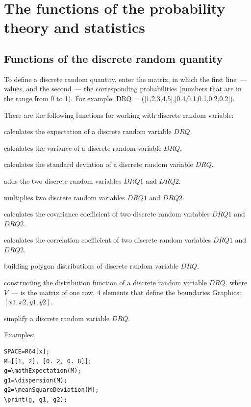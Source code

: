 \chapter{The functions of the probability theory and statistics}

\section{ Functions of the discrete random quantity}
To define a discrete random quantity, 
enter the matrix, in which the first line~--- values, and the second~--- the corresponding probabilities
(numbers that are in the range from 0 to 1). For example: DRQ = ([1,2,3,4,5],[0.4,0.1,0.1,0.2,0.2]).

There are the following functions for working with discrete random variable:

 calculates the expectation of a discrete random variable $DRQ$. 

 calculates the variance of a discrete random variable $DRQ$. 

 calculates the standard deviation of a discrete random variable $DRQ$. 

 adds the two discrete random variables $DRQ1$ and $DRQ2$. 

 multiplies two discrete random variables $DRQ1$ and $DRQ2$. 

 calculates the covariance coefficient of two discrete random variables $DRQ1$ and $DRQ2$. 

 calculates the correlation coefficient of two discrete random variables $DRQ1$ and $DRQ2$. 

 building polygon distributions of discrete random variable $DRQ$. 

 constructing the distribution function of a discrete random variable $DRQ$,  
 where $V$~--- is the matrix of one row, 4 elements that define the boundaries Graphics: $[x1, x2, y1, y2]$. 

  simplify a discrete random variable $DRQ$. 

\underline{Examples:}

\vspace*{-2mm}
\begin{verbatim}
SPACE=R64[x];
M=[[1, 2], [0. 2, 0. 8]];
g=\mathExpectation(M); 
g1=\dispersion(M); 
g2=\meanSquareDeviation(M);  
\print(g, g1, g2);
\end{verbatim}

